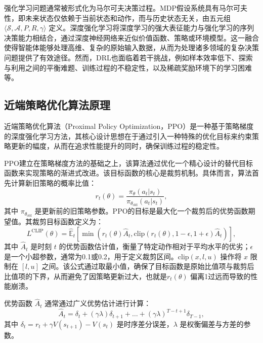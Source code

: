 强化学习问题通常被形式化为马尔可夫决策过程。MDP假设系统具有马尔可夫性，即未来状态仅依赖于当前状态和动作，而与历史状态无关，由五元组 $\langle \mathcal{S}, \mathcal{A}, P, R, \gamma \rangle$ 定义。深度强化学习将深度学习的强大表征能力与强化学习的序列决策能力相结合，通过深度神经网络来近似价值函数、策略或环境模型。这一融合使得智能体能够处理高维、复杂的原始输入数据，从而为处理诸多领域的复杂决策问题提供了有效途径。然而，DRL也面临着若干挑战，例如样本效率低下、探索与利用之间的平衡难题、训练过程的不稳定性，以及稀疏奖励环境下的学习困难等。

\subsection{近端策略优化算法原理}
\label{subsec:ppo-algorithm}

近端策略优化算法（Proximal Policy Optimization，PPO）\cite{PPO2017}是一种基于策略梯度的深度强化学习方法，其核心设计思想在于通过引入一种特殊的优化目标来约束策略更新的幅度，从而在追求性能提升的同时，确保训练过程的稳定性。

PPO建立在策略梯度方法的基础之上，该算法通过优化一个精心设计的替代目标函数来实现策略的渐进式改进。该目标函数的核心是裁剪机制。具体而言，算法首先计算新旧策略的概率比值：
\begin{equation}
    r_t(\theta) = \frac{\pi_\theta(a_t | s_t)}{\pi_{\theta_{\text{old}}}(a_t | s_t)},
\end{equation}
其中 $\pi_{\theta_{\text{old}}}$ 是更新前的旧策略参数。PPO的目标是最大化一个裁剪后的优势函数期望值。其裁剪目标函数定义为：
\begin{equation}
    L^{\text{CLIP}}(\theta) = \hat{\mathbb{E}}_t \left[ \min\left( r_t(\theta) \hat{A}_t, \text{clip}(r_t(\theta), 1-\epsilon, 1+\epsilon) \hat{A}_t \right) \right],
\end{equation}
其中 $\hat{A}_t$ 是时刻 $t$ 的优势函数估计值，衡量了特定动作相对于平均水平的优劣；$\epsilon$ 是一个小超参数，通常为0.1或0.2，用于定义裁剪区间。$\text{clip}(x, l, u)$ 操作将 $x$ 限制在 $[l, u]$ 之间。该公式通过取最小值，确保了目标函数是原始比值项与裁剪后比值项的下界，从而避免了因策略更新过大，也就是$r_t(\theta)$ 偏离1过远而导致的性能崩溃。

优势函数 $\hat{A}_t$ 通常通过广义优势估计进行计算：
\begin{equation}
    \hat{A}_t = \delta_t + (\gamma \lambda) \delta_{t+1} + \dots + (\gamma \lambda)^{T-t+1} \delta_{T-1},
\end{equation}
其中 $\delta_t = r_t + \gamma V(s_{t+1}) - V(s_t)$ 是时序差分误差，$\lambda$ 是权衡偏差与方差的参数。

